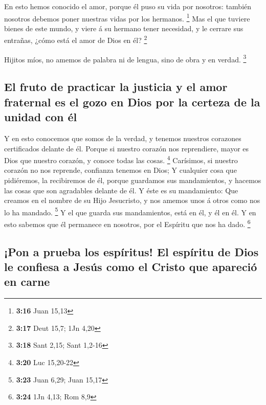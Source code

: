  En esto hemos conocido el amor, porque él puso su vida por
nosotros: también nosotros debemos poner nuestras vidas por los
hermanos. \footnote{\textbf{3:16} Juan 15,13}  Mas el que
tuviere bienes de este mundo, y viere á su hermano tener necesidad, y le
cerrare sus entrañas, ¿cómo está el amor de Dios en él? \footnote{\textbf{3:17}
  Deut 15,7; 1Jn 4,20}

 Hijitos míos, no amemos de palabra ni de lengua, sino de
obra y en verdad. \footnote{\textbf{3:18} Sant 2,15; Sant 1,2-16}

\hypertarget{el-fruto-de-practicar-la-justicia-y-el-amor-fraternal-es-el-gozo-en-dios-por-la-certeza-de-la-unidad-con-uxe9l}{%
\subsection{El fruto de practicar la justicia y el amor fraternal es el
gozo en Dios por la certeza de la unidad con
él}\label{el-fruto-de-practicar-la-justicia-y-el-amor-fraternal-es-el-gozo-en-dios-por-la-certeza-de-la-unidad-con-uxe9l}}

 Y en esto conocemos que somos de la verdad, y tenemos
nuestros corazones certificados delante de él.  Porque si
nuestro corazón nos reprendiere, mayor es Dios que nuestro corazón, y
conoce todas las cosas. \footnote{\textbf{3:20} Luc 15,20-22}
 Carísimos, si nuestro corazón no nos reprende, confianza
tenemos en Dios;  Y cualquier cosa que pidiéremos, la
recibiremos de él, porque guardamos sus mandamientos, y hacemos las
cosas que son agradables delante de él.  Y éste es su
mandamiento: Que creamos en el nombre de su Hijo Jesucristo, y nos
amemos unos á otros como nos lo ha mandado. \footnote{\textbf{3:23} Juan
  6,29; Juan 15,17}  Y el que guarda sus mandamientos, está
en él, y él en él. Y en esto sabemos que él permanece en nosotros, por
el Espíritu que nos ha dado. \footnote{\textbf{3:24} 1Jn 4,13; Rom 8,9}

\hypertarget{pon-a-prueba-los-espuxedritus-el-espuxedritu-de-dios-le-confiesa-a-jesuxfas-como-el-cristo-que-apareciuxf3-en-carne}{%
\subsection{¡Pon a prueba los espíritus! El espíritu de Dios le confiesa
a Jesús como el Cristo que apareció en
carne}\label{pon-a-prueba-los-espuxedritus-el-espuxedritu-de-dios-le-confiesa-a-jesuxfas-como-el-cristo-que-apareciuxf3-en-carne}}

